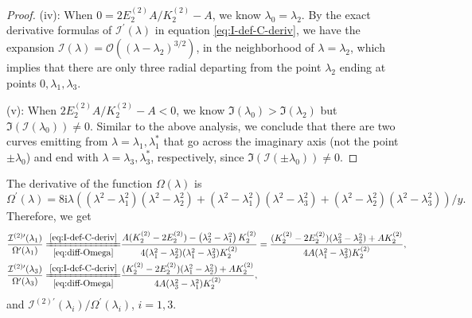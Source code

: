 \documentclass[11pt,reqno]{amsart}
\newcommand{\ii}{\mathrm{i}}
\numberwithin{equation}{section}
\begin{document}
\begin{proof}
	(iv): When $0=2E^{(2)}_2A/K^{(2)}_2-A$, we know $\lambda_0=\lambda_2$. 
	By the exact derivative formulas of $\mathcal{I}^{\prime}(\lambda)$ in equation \eqref{eq:I-def-C-deriv}, we have the expansion $\mathcal{I}(\lambda)=\mathcal{O}((\lambda-\lambda_2)^{3/2})$, in the neighborhood of $\lambda=\lambda_2$, which implies that there are only three radial departing from the point $\lambda_2$ ending at points $0,\lambda_1,\lambda_3$.
		
	(v): When $2E^{(2)}_2A/K^{(2)}_2-A<0$, we know $\Im(\lambda_0)>\Im(\lambda_2)$ but $\Im(\mathcal{I}(\lambda_0))\neq 0$.  
	Similar to the above analysis, we conclude that there are two curves emitting from $\lambda=\lambda_{1}, \lambda_1^*$ that go across the imaginary axis (not the point $\pm\lambda_0$) and end with $\lambda=\lambda_3, \lambda_3^*$, respectively, since $\Im(\mathcal{I}(\pm\lambda_0))\neq 0$.
\end{proof}

The derivative of the function $\Omega(\lambda)$ is
\begin{equation}\label{eq:diff-Omega}
	\Omega^{\prime}(\lambda)=8\ii \lambda\left((\lambda^2-\lambda_1^2)(\lambda^2-\lambda_2^2)+(\lambda^2-\lambda_1^2)(\lambda^2-\lambda_3^2)+(\lambda^2-\lambda_2^2)(\lambda^2-\lambda_3^2)\right)/y.
\end{equation}
Therefore, we get 
\begin{equation}\label{eq:derivative-1}
	\begin{split}
		\frac{\mathcal{I}^{(2)\prime}(\lambda_1)}{\Omega^{\prime}(\lambda_1)}
		\xlongequal[\eqref{eq:diff-Omega}]{\eqref{eq:I-def-C-deriv}}&\frac{A(K^{(2)}_2-2E^{(2)}_2)-\left(\lambda_2^2-\lambda_1^2\right)K^{(2)}_2}{4(\lambda_1^2-\lambda_2^2)(\lambda_1^2-\lambda_3^2)K^{(2)}_2}
		=\frac{(K^{(2)}_2-2E^{(2)}_2)(\lambda_3^2-\lambda_2^2)+AK^{(2)}_2}{4A(\lambda_1^2-\lambda_3^2)K^{(2)}_2},\\
		\frac{\mathcal{I}^{(2)\prime}(\lambda_3)}{\Omega^{\prime}(\lambda_3)}
		\xlongequal[\eqref{eq:diff-Omega}]{\eqref{eq:I-def-C-deriv}}&\frac{(K^{(2)}_2-2E^{(2)}_2)(\lambda_1^2-\lambda_2^2)+AK^{(2)}_2}{4A(\lambda_3^2-\lambda_1^2)K^{(2)}_2},
	\end{split}
\end{equation}
and $\mathcal{I}^{(2)\prime}(\lambda_i)/\Omega^{\prime}(\lambda_i)$, $i=1,3$.
\end{document}
